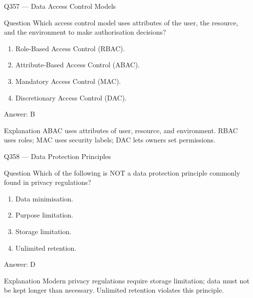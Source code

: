 \documentclass[aspectratio=169,8pt]{beamer}
\begin{document}
	\begin{frame}{Q357 --- Data Access Control Models}
		\begin{block}{Question}
			Which access control model uses attributes of the user, the resource, and the environment to make authorisation decisions?
			\begin{enumerate}
				\item Role-Based Access Control (RBAC).
				\item Attribute-Based Access Control (ABAC).
				\item Mandatory Access Control (MAC).
				\item Discretionary Access Control (DAC).
			\end{enumerate}
		\end{block}
		\begin{exampleblock}{Answer: B}\end{exampleblock}
		\begin{block}{Explanation}
			ABAC uses attributes of user, resource, and environment. RBAC uses roles; MAC uses security labels; DAC lets owners set permissions.
		\end{block}
	\end{frame}
	
	\begin{frame}{Q358 --- Data Protection Principles}
		\begin{block}{Question}
			Which of the following is NOT a data protection principle commonly found in privacy regulations?
			\begin{enumerate}
				\item Data minimisation.
				\item Purpose limitation.
				\item Storage limitation.
				\item Unlimited retention.
			\end{enumerate}
		\end{block}
		\begin{exampleblock}{Answer: D}\end{exampleblock}
		\begin{block}{Explanation}
			Modern privacy regulations require storage limitation; data must not be kept longer than necessary. Unlimited retention violates this principle.
		\end{block}
	\end{frame}
	
\end{document}
